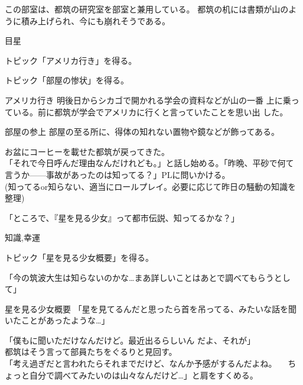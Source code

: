 \documentclass[a4paper,8pt,min]{jsarticle}
\begin{document}
この部室は、都筑の研究室を部室と兼用している。
都筑の机には書類が山のように積み上げられ、今にも崩れそうである。

\begin{judge}{目星}
 \item トピック「アメリカ行き」を得る。
 \item トピック「部屋の惨状」を得る。
\end{judge}

\begin{topic}
 \item[アメリカ行き] 明後日からシカゴで開かれる学会の資料などが山の一番
 上に乗っている。前に都筑が学会でアメリカに行くと言っていたことを思い出
 した。
 \item[部屋の参上] 部屋の至る所に、得体の知れない置物や鏡などが飾ってある。
\end{topic}
\newpage

お盆にコーヒーを載せた都筑が戻ってきた。\\
「それで今日呼んだ理由なんだけれども。」と話し始める。「昨晩、平砂で何て
言うか------事故があったのは知ってる？」PLに問いかける。\\

(知ってるor知らない、適当にロールプレイ。必要に応じて昨日の騒動の知識を
整理)

「ところで、『星を見る少女』って都市伝説、知ってるかな？」

\begin{judge}{知識,幸運}
 \item トピック「星を見る少女概要」を得る。
 \item 「今の筑波大生は知らないのかな…まあ詳しいことはあとで調べてもらうとして」
\end{judge}

\begin{topic}
 \item[星を見る少女概要] 「星を見てるんだと思ったら首を吊ってる、みたいな話を聞いたことがあったような…」
\end{topic}

「僕もに聞いただけなんだけど。最近出るらしいん
だよ、それが」\\

都筑はそう言って部員たちをぐるりと見回す。\\

「考え過ぎだと言われたらそれまでだけど、なんか予感がするんだよね。
　ちょっと自分で調べてみたいのは山々なんだけど…」と肩をすくめる。\\
\end{document}
